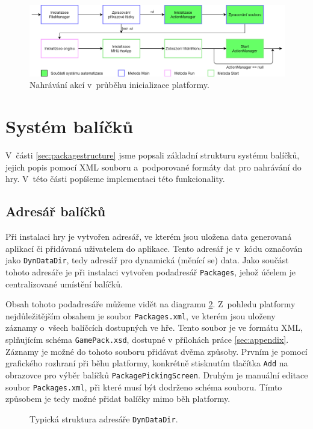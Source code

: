 \begin{figure}[h]
	\centering
	\includegraphics[width=\textwidth]{img/MenuActions.png}
	\caption{Nahrávání akcí v~průběhu inicializace platformy.}
	\label{fig:uiautomationload}
\end{figure}

\section{Systém balíčků}
V~části \ref{sec:packagestructure} jsme popsali základní strukturu systému balíčků, jejich popis pomocí XML souboru a~podporované formáty dat pro nahrávání do hry. V~této části popíšeme implementaci této funkcionality.

\subsection{Adresář balíčků}
\label{sec:packagedir}
Při instalaci hry je vytvořen adresář, ve kterém jsou uložena data generovaná aplikací či přidávaná uživatelem do aplikace. Tento adresář je v~kódu označován jako \texttt{DynDataDir}, tedy adresář pro dynamická (měnící se) data. Jako součást tohoto adresáře je při instalaci vytvořen podadresář \texttt{Packages}, jehož účelem je centralizované umístění balíčků.

Obsah tohoto podadresáře můžeme vidět na diagramu \ref{fig:packagesdir}. Z~pohledu platformy nejdůležitějším obsahem je soubor \texttt{Packages.xml}, ve kterém jsou uloženy záznamy o~všech balíčcích dostupných ve hře. Tento soubor je ve formátu XML, splňujícím schéma \texttt{GamePack.xsd}, dostupné v přílohách práce \ref{sec:appendix}. Záznamy je možné do tohoto souboru přidávat dvěma způsoby. Prvním je pomocí grafického rozhraní při běhu platformy, konkrétně stisknutím tlačítka \texttt{Add} na obrazovce pro výběr balíčků \texttt{PackagePickingScreen}. Druhým je manuální editace soubor \texttt{Packages.xml}, při které musí být dodrženo schéma souboru. Tímto způsobem je tedy možné přidat balíčky mimo běh platformy. 

\begin{figure}[h]
	\centering
	\fontsize{6pt}{7pt}\selectfont
	\def\svgwidth{0.7\textwidth}
	
	\caption{Typická struktura adresáře \texttt{DynDataDir}.}
	\label{fig:packagesdir}
\end{figure}

